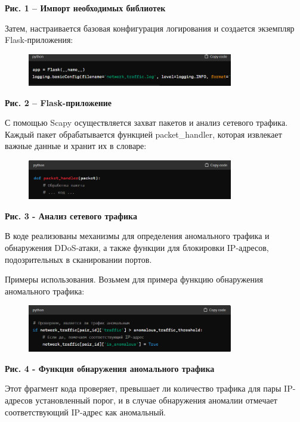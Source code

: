 \textbf{Рис. 1 -- Импорт необходимых библиотек}

Затем, настраивается базовая конфигурация логирования и создается
экземпляр Flask-приложения:

\begin{figure}[H]
	\centering
	\includegraphics[width=0.8\textwidth]{assets/48}
	\caption*{}
\end{figure}

\textbf{Рис. 2 -- Flask-приложение}

С помощью Scapy осуществляется захват пакетов и анализ сетевого трафика.
Каждый пакет обрабатывается функцией packet\_handler, которая извлекает
важные данные и хранит их в словаре:

\begin{figure}[H]
	\centering
	\includegraphics[width=0.8\textwidth]{assets/49}
	\caption*{}
\end{figure}

\textbf{Рис. 3 - Анализ сетевого трафика}

В коде реализованы механизмы для определения аномального трафика и
обнаружения DDoS-атаки, а также функции для блокировки IP-адресов,
подозрительных в сканировании портов.

Примеры использования. Возьмем для примера функцию обнаружения
аномального трафика:

\begin{figure}[H]
	\centering
	\includegraphics[width=0.8\textwidth]{assets/50}
	\caption*{}
\end{figure}

\textbf{Рис. 4 - Функция обнаружения аномального трафика}

Этот фрагмент кода проверяет, превышает ли количество трафика для пары
IP-адресов установленный порог, и в случае обнаружения аномалии отмечает
соответствующий IP-адрес как аномальный.

